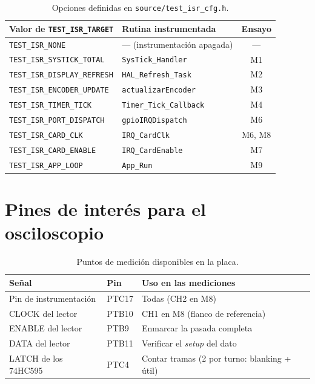 \documentclass[11pt,a4paper]{article}
\begin{document}
\begin{table}[H]
\centering
\begin{tabular}{@{}llc@{}}
\toprule
\textbf{Valor de \texttt{TEST\_ISR\_TARGET}} & \textbf{Rutina instrumentada} & \textbf{Ensayo} \\
\midrule
\texttt{TEST\_ISR\_NONE}            & --- (instrumentación apagada)   & ---  \\
\texttt{TEST\_ISR\_SYSTICK\_TOTAL}  & \texttt{SysTick\_Handler}       & M1   \\
\texttt{TEST\_ISR\_DISPLAY\_REFRESH}& \texttt{HAL\_Refresh\_Task}     & M2   \\
\texttt{TEST\_ISR\_ENCODER\_UPDATE} & \texttt{actualizarEncoder}      & M3   \\
\texttt{TEST\_ISR\_TIMER\_TICK}     & \texttt{Timer\_Tick\_Callback}  & M4   \\
\texttt{TEST\_ISR\_PORT\_DISPATCH}  & \texttt{gpioIRQDispatch}        & M6   \\
\texttt{TEST\_ISR\_CARD\_CLK}       & \texttt{IRQ\_CardClk}           & M6, M8 \\
\texttt{TEST\_ISR\_CARD\_ENABLE}    & \texttt{IRQ\_CardEnable}        & M7   \\
\texttt{TEST\_ISR\_APP\_LOOP}       & \texttt{App\_Run}               & M9   \\
\bottomrule
\end{tabular}
\caption{Opciones definidas en \texttt{source/test\_isr\_cfg.h}.}
\end{table}

\section{Pines de interés para el osciloscopio}

\begin{table}[H]
\centering
\begin{tabular}{@{}lll@{}}
\toprule
\textbf{Señal} & \textbf{Pin} & \textbf{Uso en las mediciones} \\
\midrule
Pin de instrumentación & PTC17 & Todas (CH2 en M8) \\
CLOCK del lector       & PTB10 & CH1 en M8 (flanco de referencia) \\
ENABLE del lector      & PTB9  & Enmarcar la pasada completa \\
DATA del lector        & PTB11 & Verificar el \textit{setup} del dato \\
LATCH de los 74HC595   & PTC4  & Contar tramas (2 por turno: blanking + útil) \\
\bottomrule
\end{tabular}
\caption{Puntos de medición disponibles en la placa.}
\end{table}
\end{document}
